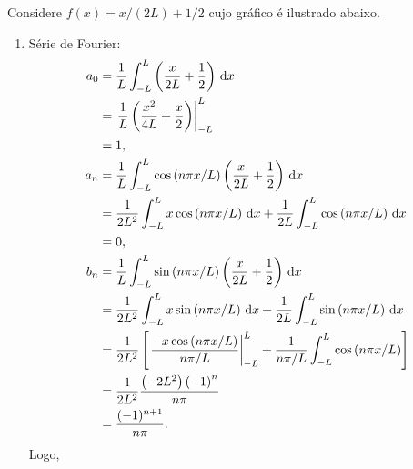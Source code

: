 \begin{exem}
    Considere $f(x) = x / \left( 2 L \right) + 1 / 2$ cujo gr\'{a}fico \'{e} ilustrado abaixo.
    \begin{center}
    \end{center}
    \begin{enumerate}
        \item S\'{e}rie de Fourier:
            \begin{align*}
                a_0 &= \frac{1}{L} \int_{-L}^L \left( \frac{x}{2 L} + \frac{1}{2} \right) \, \mathrm{d}x \\
                &= \left. \frac{1}{L} \left( \frac{x^2}{4 L} + \frac{x}{2} \right) \right|_{-L}^L \\
                &= 1, \\
                a_n &= \frac{1}{L} \int_{-L}^L \cos\left( n \pi x / L \right) \left( \frac{x}{2 L} + \frac{1}{2} \right) \, \mathrm{d}x \\
                &= \frac{1}{2 L^2} \int_{-L}^L x \cos\left( n \pi x / L \right) \, \mathrm{d}x + \frac{1}{2L} \int_{-L}^L \cos\left( n \pi x / L \right) \, \mathrm{d}x \\
                &= 0, \\
                b_n &= \frac{1}{L} \int_{-L}^L \sin\left( n \pi x / L \right) \left( \frac{x}{2L} + \frac{1}{2} \right) \, \mathrm{d}x \\
                &= \frac{1}{2L^2} \int_{-L}^L x \sin\left( n \pi x / L \right) \, \mathrm{d}x + \frac{1}{2L} \int_{-L}^L \sin\left( n \pi x / L \right) \, \mathrm{d}x \\
                &= \frac{1}{2L^2} \left[ \left. \frac{-x \cos\left( n \pi x / L \right)}{n \pi / L} \right|_{-L}^L + \frac{1}{n \pi / L} \int_{-L}^L \cos\left( n \pi x / L \right) \right] \\
                &= \frac{1}{2L^2} \frac{\left( -2L^2 \right) \left( -1 \right)^n}{n \pi} \\
                &= \frac{(-1)^{n + 1}}{n \pi}.
            \end{align*}
            Logo,
            \begin{align*}

\end{align*}
\end{enumerate}
\end{exem}
